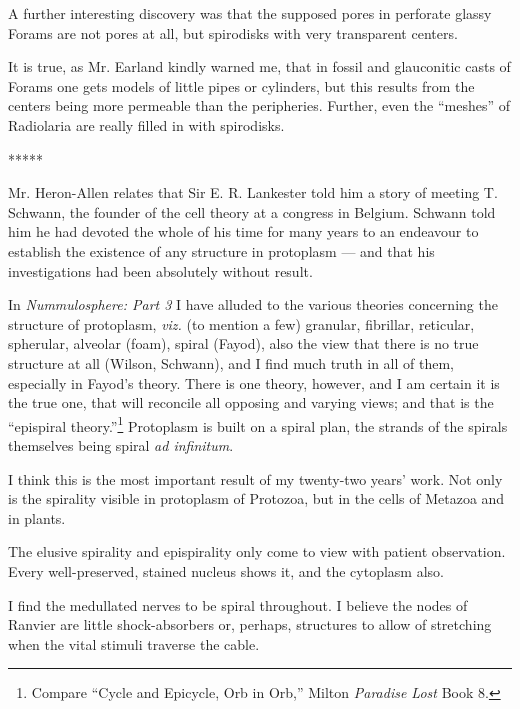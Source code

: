 \documentclass[a4paper, 12pt, oneside]{article}
\begin{document}
A further interesting discovery was that the supposed pores in perforate glassy Forams are not pores at all, but spirodisks with very transparent centers.

It is true, as Mr. Earland kindly warned me, that in fossil and glauconitic casts of Forams one gets models of little pipes or cylinders, but this results from the centers being more permeable than the peripheries. Further, even the ``meshes'' of Radiolaria are really filled in with spirodisks.

\centerline{*\hspace{15mm}*\hspace{15mm}*\hspace{15mm}*\hspace{15mm}*}
\bigskip

Mr. Heron-Allen relates that Sir E. R. Lankester told him a story of meeting T. Schwann, the founder of the cell theory at a congress in Belgium. Schwann told him he had devoted the whole of his time for many years to an endeavour to establish the existence of any structure in protoplasm --- and that his investigations had been absolutely without result.

In \emph{Nummulosphere: Part 3} I have alluded to the various theories concerning the structure of protoplasm, \emph{viz.} (to mention a few) granular, fibrillar, reticular, spherular, alveolar (foam), spiral (Fayod), also the view that there is no true structure at all (Wilson, Schwann), and I find much truth in all of them, especially in Fayod's theory. There is one theory, however, and I am certain it is the true one, that will reconcile all opposing and varying views; and that is the ``epispiral theory.''\footnote{Compare ``Cycle and Epicycle, Orb in Orb,'' Milton \emph{Paradise Lost} Book 8.} Protoplasm is built on a spiral plan, the strands of the spirals themselves being spiral \emph{ad infinitum}.

I think this is the most important result of my twenty-two years' work. Not only is the spirality visible in protoplasm of Protozoa, but in the cells of Metazoa and in plants.

The elusive spirality and epispirality only come to view with patient observation. Every well-preserved, stained nucleus shows it, and the cytoplasm also.

I find the medullated nerves to be spiral throughout. I believe the nodes of Ranvier are little shock-absorbers or, perhaps, structures to allow of stretching when the vital stimuli traverse the cable.
\end{document}
